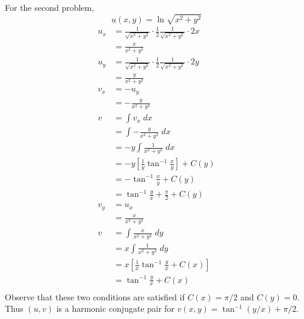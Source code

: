 \documentclass{article}
\theoremstyle{definition}
\newcommand{\sq}[1]{\left[#1\right]}
\begin{document}
For the second problem,
\[ u(x,y) = \ln \sqrt{x^2+y^2} \]
\begin{align*}
u_x 
&= \frac{1}{\sqrt{x^2+y^2}} 
\cdot \frac{1}{2} \frac{1}{\sqrt{x^2+y^2}}
\cdot 2x \\
&= \frac{x}{x^2 + y^2} \\
u_y
&= \frac{1}{\sqrt{x^2+y^2}} 
\cdot \frac{1}{2} \frac{1}{\sqrt{x^2+y^2}}
\cdot 2y \\
&= \frac{y}{x^2 + y^2} \\
v_x &= -u_y \\
&= - \frac{y}{x^2+y^2} \\
v
&=\int v_x \;dx \\
&= \int -\frac{y}{x^2+y^2} \;dx \\
&= - y \int \frac{1}{x^2+y^2} \;dx \\
&= - y \sq{\frac{1}{y} \tan^{-1} \frac{x}{y}} +C(y) \\
&= - \tan^{-1} \frac{x}{y} + C(y)\\
&= \tan^{-1} \frac{y}{x} + \frac{\pi}{2} + C(y) \\
v_y &= u_x \\
&= \frac{x}{x^2+y^2} \\
v
&= \int \frac{x}{x^2+y^2} \;dy \\
&= x \int \frac{1}{x^2+y^2} \;dy \\
&= x \sq{ \frac{1}{x}\tan^{-1} \frac{y}{x} + C(x)} \\
&= \tan^{-1} \frac{y}{x} + C(x) \\
\end{align*}
Observe that these two conditions are satisfied if $C(x)=\pi/2$ and $C(y)=0$. 
Thus $(u,v)$ is a harmonic conjugate pair for $v(x,y)=\tan^{-1} (y/x)+\pi/2$.
\end{document}
